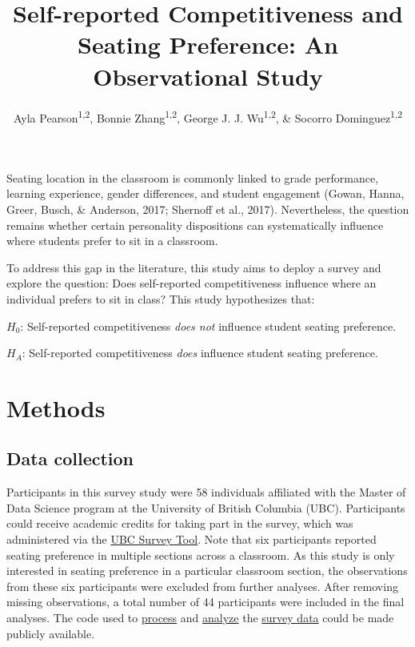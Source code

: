 \documentclass[man]{apa6}
\title{Self-reported Competitiveness and Seating Preference: An Observational Study}
\author{Ayla Pearson\textsuperscript{1,2}, Bonnie Zhang\textsuperscript{1,2}, George J. J. Wu\textsuperscript{1,2}, \& Socorro Dominguez\textsuperscript{1,2}}
\date{}
\affiliation{
\vspace{0.5cm}
\textsuperscript{1} The University of British Columbia\\\textsuperscript{2} Master of Data Science Program}
\begin{document}
\maketitle

Seating location in the classroom is commonly linked to grade performance, learning experience, gender differences, and student engagement (Gowan, Hanna, Greer, Busch, \& Anderson, 2017; Shernoff et al., 2017). Nevertheless, the question remains whether certain personality dispositions can systematically influence where students prefer to sit in a classroom.

To address this gap in the literature, this study aims to deploy a survey and explore the question: Does self-reported competitiveness influence where an individual prefers to sit in class? This study hypothesizes that:

\(H_{0}\): Self-reported competitiveness \emph{does not} influence student seating preference.

\(H_{A}\): Self-reported competitiveness \emph{does} influence student seating preference.

\hypertarget{methods}{%
\section{Methods}\label{methods}}

\hypertarget{data-collection}{%
\subsection{Data collection}\label{data-collection}}

Participants in this survey study were 58 individuals affiliated with the Master of Data Science program at the University of British Columbia (UBC). Participants could receive academic credits for taking part in the survey, which was administered via the \href{https://it.ubc.ca/services/teaching-learning-tools/survey-tool}{UBC Survey Tool}. Note that six participants reported seating preference in multiple sections across a classroom. As this study is only interested in seating preference in a particular classroom section, the observations from these six participants were excluded from further analyses. After removing missing observations, a total number of 44 participants were included in the final analyses. The code used to \href{https://github.ubc.ca/sedv8808/seat_pref_survey/blob/master/src/prepare_data.R}{process} and \href{https://github.com/UBC-MDS/seating_pref/blob/master/doc/eda.md}{analyze} the \href{https://github.ubc.ca/sedv8808/seat_pref_survey}{survey data} could be made publicly available.
\end{document}
